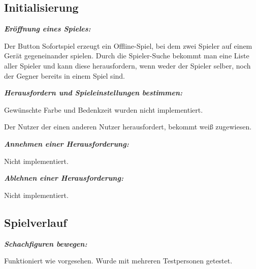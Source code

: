 \documentclass[parskip=full]{scrartcl}
\begin{document}
\begin{description}
	
	\subsection{Initialisierung}
	\item[T2010] \textbf{\textit{Eröffnung eines Spieles: }} 
	\begin{description}
	\item Der Button Sofortspiel erzeugt ein Offline-Spiel, bei dem zwei Spieler auf einem Gerät gegeneinander spielen. Durch die Spieler-Suche bekommt man eine Liste aller Spieler und kann diese herausfordern, wenn weder der Spieler selber, noch der Gegner bereits in einem Spiel sind.
	\end{description}
	

	
	\item[T2020] \textbf{\textit{Herausfordern und Spieleinstellungen bestimmen: }} 
	\begin{description}
	\item Gewünschte Farbe und Bedenkzeit wurden nicht implementiert.
	\item Der Nutzer der einen anderen Nutzer herausfordert, bekommt weiß zugewiesen.
	\end{description}
	

	
	\item[T2030] \textbf{\textit{Annehmen einer Herausforderung: }} 
	\begin{description}
	\item Nicht implementiert.
	\end{description}

	
	\item[T2040] \textbf{\textit{Ablehnen einer Herausforderung: }} 
	\begin{description}
	\item Nicht implementiert.
	\end{description}

	
	\subsection{Spielverlauf}
	
	\item[T3010] \textbf{\textit{Schachfiguren bewegen: }} 
	\begin{description}
	\item Funktioniert wie vorgesehen. Wurde mit mehreren Testpersonen getestet.
	\end{description}
			

\end{description}
\end{document}
